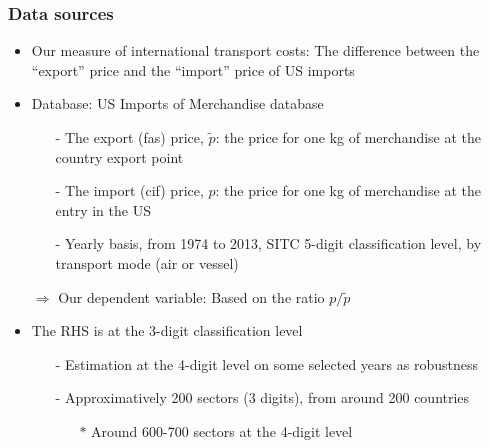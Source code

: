 \documentclass[10 pt,Helvetica, french]{beamer}
\begin{document}
\begin{frame} [label=slide_data]
\frametitle{Data sources}
\begin{itemize}
\item Our measure of international transport costs: The difference between the ``export'' price and the ``import'' price of US imports\vspace{0.1cm}
\item Database: US Imports of Merchandise database \vspace{0.1cm}
\begin{itemize}
\item[-] The export (fas) price, $\widetilde{p}$: the price for one kg of merchandise at the country export point \vspace{0.1cm}
\item[-] The import (cif) price, $p$: the price for one kg of merchandise at the entry in the US \vspace{0.1cm}
\item[-] Yearly basis, from 1974 to 2013, SITC 5-digit classification level, by transport mode (air or vessel) \vspace{0.1cm}
\end{itemize}
\item[$\Rightarrow$] Our dependent variable: Based on the ratio $p/\widetilde{p}$ \vspace{0.1cm}
\item The RHS is at the 3-digit classification level  \vspace{0.1cm}
\begin{itemize}
\item[-] Estimation at the 4-digit level on some selected years as robustness \vspace{0.1cm}
\item[-] Approximatively 200 sectors (3 digits), from around 200 countries  \vspace{0.1cm}
\begin{itemize}
\item[$\ast$] Around 600-700 sectors at the 4-digit level
\end{itemize}
\end{itemize}
\end{itemize}
\end{frame}
\end{document}
